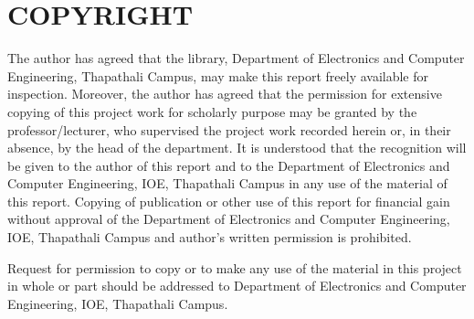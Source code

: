 \cleardoublepage
{}
\chapter*{COPYRIGHT}
{}

The author has agreed that the library, Department of Electronics and Computer Engineering, Thapathali Campus, may make this report freely available for inspection. Moreover, the author has agreed that the permission for extensive copying of this project work for scholarly purpose may be granted by the professor/lecturer, who supervised the project work recorded herein or, in their absence, by the head of the department. It is understood that the recognition will be given to the author of this report and to the Department of Electronics and Computer Engineering, IOE, Thapathali Campus in any use of the material of this report. Copying of publication or other use of this report for financial gain without approval of the Department of Electronics and Computer Engineering, IOE, Thapathali Campus and author's written permission is prohibited. 

Request for permission to copy or to make any use of the material in this project in whole or part should be addressed to Department of Electronics and Computer
Engineering, IOE, Thapathali Campus.